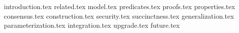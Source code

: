 {introduction.tex}
{related.tex}
{model.tex}
{predicates.tex}
{proofs.tex}
{properties.tex}
{consensus.tex}
{construction.tex}
{security.tex}
{succinctness.tex}
{generalization.tex}
{parameterization.tex}
{integration.tex}
{upgrade.tex}
{future.tex}
